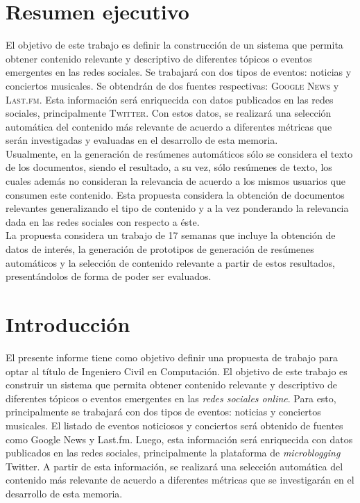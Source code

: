 \documentclass[11pt,letterpaper]{article}
\begin{document}
\section*{Resumen ejecutivo}
\begin{spacing}{1.5}

El objetivo de este trabajo es definir la construcción de un sistema
que permita obtener contenido relevante y descriptivo de diferentes
tópicos o eventos emergentes en las redes sociales. Se trabajará con
dos tipos de eventos: noticias y conciertos musicales. Se obtendrán de
dos fuentes respectivas: \textsc{Google News} y \textsc{Last.fm}. 
Esta información será enriquecida con datos publicados en las redes
sociales, principalmente \textsc{Twitter}. Con estos datos, se realizará una selección
automática del contenido más relevante de acuerdo a diferentes
métricas que serán investigadas y evaluadas en el desarrollo de esta
memoria. \\

Usualmente, en la generación de resúmenes automáticos sólo se considera
el texto de los documentos, siendo el resultado, a su vez, sólo
resúmenes de texto, los cuales además no consideran la relevancia de
acuerdo a los mismos usuarios que consumen este contenido. Esta
propuesta considera la obtención de documentos relevantes
generalizando el tipo de contenido y a la vez ponderando la relevancia
dada en las redes sociales con respecto a éste. \\

La propuesta considera un trabajo de 17 semanas que incluye la
obtención de datos de interés, la generación de prototipos de
generación de resúmenes automáticos y la selección de contenido
relevante a partir de estos resultados, presentándolos de forma de
poder ser evaluados.


\end{spacing}
\newpage


\newpage
\tableofcontents
\newpage

\setlength\parskip{5mm}

\section{Introducción}
\label{sec-1}

  El presente informe tiene como objetivo definir una propuesta de
  trabajo para optar al título de Ingeniero Civil en Computación. El
  objetivo de este trabajo es construir un sistema que permita obtener
  contenido relevante y descriptivo de diferentes tópicos o eventos
  emergentes en las \emph{redes sociales online}. Para esto, principalmente
  se trabajará con dos tipos de eventos: noticias y conciertos
  musicales. El listado de eventos noticiosos y conciertos será
  obtenido de fuentes como Google News y Last.fm. Luego, esta
  información será enriquecida con datos publicados en las redes
  sociales, principalmente la plataforma de \emph{microblogging} Twitter. A
  partir de esta información, se realizará una selección automática
  del contenido más relevante de acuerdo a diferentes métricas que se
  investigarán en el desarrollo de esta memoria.
 
\end{document}
